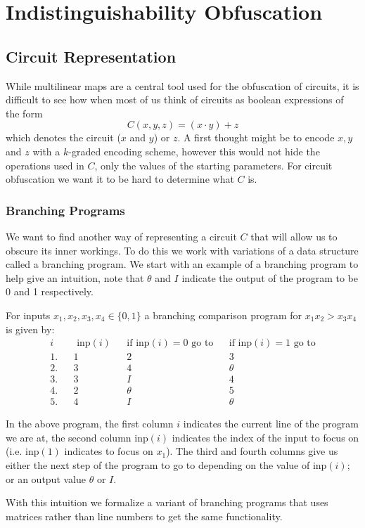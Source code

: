 \documentclass[12pt,twoside]{reedthesis}
\begin{document}
    
    
    
    
    \chapter{Indistinguishability Obfuscation}
    
    \section{Circuit Representation}
    While multilinear maps are a central tool used for the obfuscation of circuits, it is difficult to see how when most of us think of circuits as boolean expressions of the form
    $$C(x,y,z) = (x \cdot y) + z $$
    which denotes the circuit ($x$ and $y$) or $z$. A first thought might be to encode $x,y$ and $z$ with a $k$-graded encoding scheme, however this would not hide the operations used in $C$, only the values of the starting parameters. For circuit obfuscation we want it to be hard to determine what $C$ is.
    
    \subsection{Branching Programs}
    
    \par We want to find another way of representing a circuit $C$ that will allow us to obscure its inner workings. To do this we work with variations of a data structure called a branching program. We start with an example of a branching program to help give an intuition, note that $\theta$ and $I$ indicate the output of the program to be 0 and 1 respectively.
      \par For inputs $x_1,x_2,x_3,x_4\in \{ 0 ,1\}$  a branching comparison program for $x_1x_2 > x_3x_4$ is given by:
    \begin{align*}
    i &&\text{ inp}(i) &&\text{if inp}(i)=0 \text{ go to} &&\text{if inp}(i)=1 \text{ go to} \\
    1. &&1 &&2 &&3 \\
    2. &&3 &&4 &&\theta \\
    3. &&3 &&I &&4 \\
    4. &&2 &&\theta &&5 \\
    5. &&4 &&I &&\theta
    \end{align*}
    
    In the above program, the first column $i$ indicates the current line of the program we are at, the second column inp$(i)$ indicates the index of the input to focus on (i.e. inp$(1)$ indicates to focus on $x_1$). The third and fourth columns give us either the next step of the program to go to depending on the value of inp$(i)$; or an output value $\theta$ or $I$.
    \par With this intuition we formalize a variant of branching programs that uses matrices rather than line numbers to get the same functionality.
\end{document}
